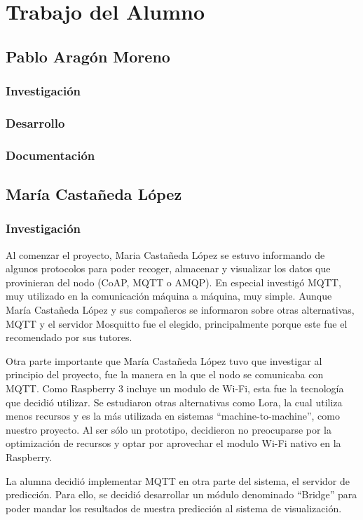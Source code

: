 \cleardoublepage

\chapter{Trabajo del Alumno}
\label{makereference11}

\section{Pablo Aragón Moreno}
\subsection{Investigación}
\subsection{Desarrollo}
\subsection{Documentación}


\section{María Castañeda López}
\subsection{Investigación}
Al comenzar el proyecto, Maria Castañeda López se estuvo informando de algunos protocolos para poder recoger, almacenar y visualizar los datos que provinieran del nodo (CoAP, MQTT o AMQP). En especial investigó MQTT, muy utilizado en la comunicación máquina a máquina, muy simple. Aunque María Castañeda López y sus compañeros se informaron sobre otras alternativas, MQTT y el servidor Mosquitto fue el elegido, principalmente porque este fue el recomendado por sus tutores. 

Otra parte importante que María Castañeda López tuvo que investigar al principio del proyecto, fue la manera en la que el nodo se comunicaba con MQTT. Como Raspberry 3 incluye un modulo de Wi-Fi, esta fue la tecnología que decidió utilizar. Se estudiaron otras alternativas como Lora, la cual utiliza menos recursos y es la más utilizada en sistemas ``machine-to-machine'', como nuestro proyecto. Al ser sólo un prototipo, decidieron no preocuparse por la optimización de recursos y optar por aprovechar el modulo Wi-Fi nativo en la Raspberry.

La alumna decidió implementar MQTT en otra parte del sistema, el servidor de predicción. Para ello, se decidió desarrollar un módulo denominado ``Bridge'' para poder mandar los resultados de nuestra predicción al sistema de visualización.

